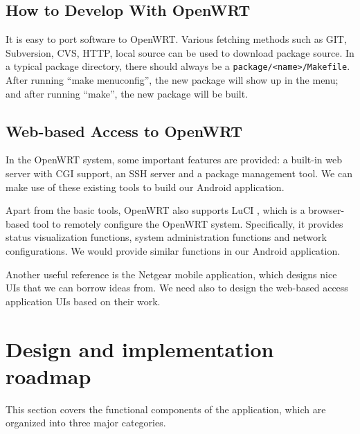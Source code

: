 \documentclass{sig-alternate-05-2015}
\begin{document}
	\subsection{How to Develop With OpenWRT}
	
	It is easy to port software to OpenWRT. Various fetching methods such as GIT, Subversion, CVS, HTTP, local source can be used to download package source. In a typical package directory, there should always be a \verb|package/<name>/Makefile|. After running ``make menuconfig'', the new package will show up in the menu; and after running ``make'', the new package will be built.
	
	\subsection{Web-based Access to OpenWRT}
	In the OpenWRT system, some important features are provided: a built-in web server with CGI support, an SSH server and a package management tool. We can make use of these existing tools to build our Android application.
	
	Apart from the basic tools, OpenWRT also supports LuCI \cite{LuCI}, which is a browser-based tool to remotely configure the OpenWRT system. Specifically, it provides status visualization functions, system administration functions and network configurations. We would provide similar functions in our Android application.
	
	Another useful reference is the Netgear \cite{netgear} mobile application, which designs nice UIs that we can borrow ideas from. We need also to design the web-based access application UIs based on their work.
	
	\section{Design and implementation \\ roadmap}
	
	This section covers the functional components of the application, which are organized into three major categories.
	
\end{document}
